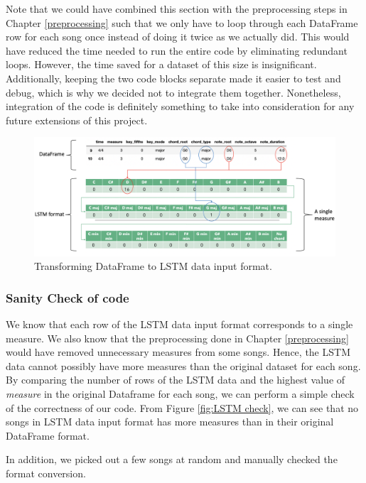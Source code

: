 Note that we could have combined this section with the preprocessing steps in Chapter \ref{preprocessing} such that we only have to loop through each DataFrame row for each song once instead of doing it twice as we actually did. This would have reduced the time needed to run the entire code by eliminating redundant loops. However, the time saved for a dataset of this size is insignificant. Additionally, keeping the two code blocks separate made it easier to test and debug, which is why we decided not to integrate them together. Nonetheless, integration of the code is definitely something to take into consideration for any future extensions of this project.
\begin{figure}
    \centering
    \includegraphics[scale=0.3]{Figures/LSTM pictorial 4}
    \decoRule
    \caption{Transforming DataFrame to LSTM data input format.}
    \label{fig:LSTM training}
    \end{figure}
    
\subsubsection{Sanity Check of code}
\label{lstm check}
We know that each row of the LSTM data input format corresponds to a single measure. We also know that the preprocessing done in Chapter \ref{preprocessing} would have removed unnecessary measures from some songs. Hence, the LSTM data cannot possibly have more measures than the original dataset for each song. By comparing the number of rows of the LSTM data and the highest value of \emph{measure} in the original Dataframe for each song, we can perform a simple check of the correctness of our code. From Figure \ref{fig:LSTM check}, we can see that no songs in LSTM data input format has more measures than in their original DataFrame format.

In addition, we picked out a few songs at random and manually checked the format conversion.

